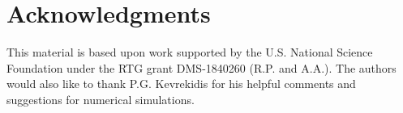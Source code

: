 \documentclass[12pt,reqno]{amsart}
\begin{document}
\section*{Acknowledgments}

This material is based upon work supported by the U.S. National Science Foundation under the RTG grant DMS-1840260 (R.P. and A.A.). The authors would also like to thank P.G. Kevrekidis for his helpful comments and suggestions for numerical simulations.



\end{document}
